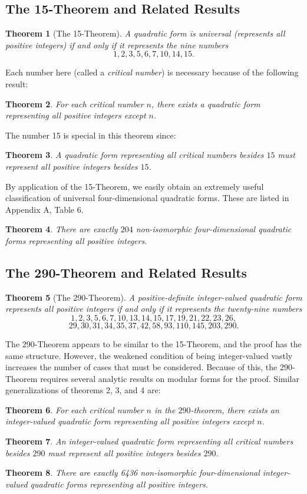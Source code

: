 \documentclass[letterpaper, 12pt]{article}
\newtheorem{thm}{Theorem}
\begin{document}
\subsection{The 15-Theorem and Related Results}
\begin{thm}[The 15-Theorem]\label{15thm}
    A quadratic form is universal (represents all positive integers) if and only if it represents the nine numbers
    \[1, 2, 3, 5, 6, 7, 10, 14, 15.\]
\end{thm}
Each number here (called a \emph{critical number}) is necessary because of the following result:
\begin{thm}\label{critnumsneeded}
    For each critical number $n$, there exists a quadratic form representing all positive integers except $n$.
\end{thm}
The number 15 is special in this theorem since:
\begin{thm}\label{15thmgeneral}
    A quadratic form representing all critical numbers besides $15$ must represent all positive integers besides $15$.
\end{thm}
By application of the 15-Theorem, we easily obtain an extremely useful classification of universal four-dimensional quadratic forms. These are listed in Appendix A, Table 6.
\begin{thm}\label{universal 4d}
    There are exactly $204$ non-isomorphic four-dimensional quadratic forms representing all positive integers.
\end{thm}

\subsection{The 290-Theorem and Related Results}
\begin{thm}[The 290-Theorem]\label{290thm}
    A positive-definite \emph{integer-valued} quadratic form represents all positive integers if and only if it represents the twenty-nine numbers
    \[1, 2, 3, 5, 6, 7, 10, 13, 14, 15, 17, 19, 21, 22, 23, 26,\]
    \[29, 30, 31, 34, 35, 37, 42, 58, 93, 110, 145, 203, 290.\]
\end{thm}
The 290-Theorem appears to be similar to the 15-Theorem, and the proof has the same structure. However, the weakened condition of being integer-valued vastly increases the number of cases that must be considered. Because of this, the 290-Theorem requires several analytic results on modular forms for the proof.
Similar generalizations of theorems 2, 3, and 4 are:
\begin{thm}\label{290critnumsneeded}
    For each critical number $n$ in the $290$-theorem, there exists an integer-valued quadratic form representing all positive integers except $n$.
\end{thm}
\begin{thm}\label{290thmgeneral}
    An integer-valued quadratic form representing all critical numbers besides $290$ must represent all positive integers besides $290$.
\end{thm}
\begin{thm}\label{290 universal 4d}
    There are exactly 6436 non-isomorphic four-dimensional integer-valued quadratic forms representing all positive integers.
\end{thm}
\end{document}
